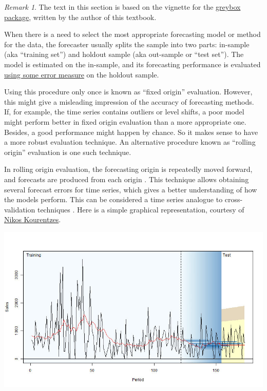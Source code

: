 \documentclass[
]{book}
\theoremstyle{definition}
\theoremstyle{definition}
\theoremstyle{definition}
\theoremstyle{definition}
\theoremstyle{remark}
\newtheorem*{remark}{Remark}
\begin{document}
\begin{remark}
The text in this section is based on the vignette for the \href{https://cran.r-project.org/package=greybox}{greybox package}, written by the author of this textbook.
\end{remark}

When there is a need to select the most appropriate forecasting model or method for the data, the forecaster usually splits the sample into two parts: in-sample (aka ``training set'') and holdout sample (aka out-sample or ``test set''). The model is estimated on the in-sample, and its forecasting performance is evaluated \protect\hyperlink{errorMeasures}{using some error measure} on the holdout sample.

Using this procedure only once is known as ``fixed origin'' evaluation. However, this might give a misleading impression of the accuracy of forecasting methods. If, for example, the time series contains outliers or level shifts, a poor model might perform better in fixed origin evaluation than a more appropriate one. Besides, a good performance might happen by chance. So it makes sense to have a more robust evaluation technique. An alternative procedure known as ``rolling origin'' evaluation is one such technique.

In rolling origin evaluation, the forecasting origin is repeatedly moved forward, and forecasts are produced from each origin \citep{Tashman2000}. This technique allows obtaining several forecast errors for time series, which gives a better understanding of how the models perform. This can be considered a time series analogue to cross-validation techniques \citep{WikipediaCrossValidation2020}. Here is a simple graphical representation, courtesy of \href{https://kourentzes.com/forecasting/}{Nikos Kourentzes}.

\includegraphics{./images/03-ROAnimation.jpg}
\end{document}
